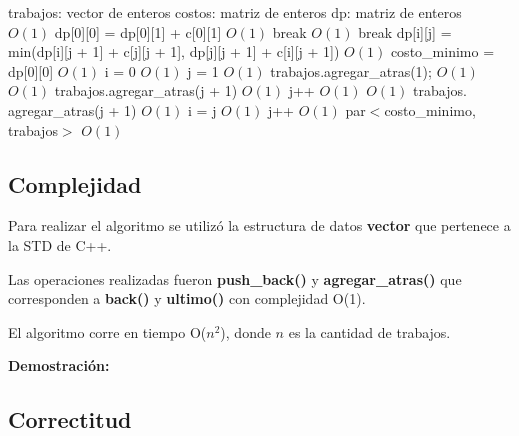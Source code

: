 \documentclass[a4paper, 10pt, twoside]{article}
\newenvironment{pseudo}[1][]{%
    \vspace{0.5em}%
    \begin{algorithmic}%
}
{%
    \end{algorithmic}%
    \vspace{0.5em}%
}
\newcommand{\Ode}[1]{\hfill $O(#1)$}
\begin{document}
\begin{pseudo}

\State trabajos: vector de enteros
\State costos: matriz de enteros
\State dp: matriz de enteros
\\
                             \Ode{1}
                \State dp[0][0] = dp[0][1] + c[0][1]  \Ode{1}
                \State break                          
            \EndIf
                                           \Ode{1}
                \State break
            \EndIf
            \State dp[i][j] = min(dp[i][j + 1] + c[j][j + 1], dp[j][j + 1] + c[i][j + 1])                          \Ode{1}
        \EndFor
    \EndFor
    \State costo\_minimo = dp[0][0]                    \Ode{1}
    \State i = 0                                       \Ode{1}
    \State j = 1                                       \Ode{1}
    \State trabajos$.$agregar\_atras(1);
            \Ode{1}
                \Ode{1}
            \State trabajos$.$agregar\_atras(j + 1)    \Ode{1}
            \State j++                                 \Ode{1}
            \EndIf
        \Else
                \Ode{1}
            \State trabajos$.$agregar\_atras(j + 1)    \Ode{1}
            \State i = j                               \Ode{1}  
            \State j++                                 \Ode{1}
            \EndIf
        \EndIf
    \EndWhile
    \Return par$<$costo\_minimo, trabajos$>$ \Ode{1}
    \EndProcedure
\end{pseudo}


\subsection{Complejidad}

Para realizar el algoritmo se utilizó la estructura de datos \textbf{vector} que pertenece a la STD de C++.

Las operaciones realizadas fueron \textbf{push\_back()} y \textbf{agregar\_atras()} que corresponden a \textbf{back()} y \textbf{ultimo()} con complejidad O(1).

El algoritmo corre en tiempo O($n^2$), donde $n$ es la cantidad de trabajos.

\textbf{Demostración: }


\subsection{Correctitud}
\end{document}
